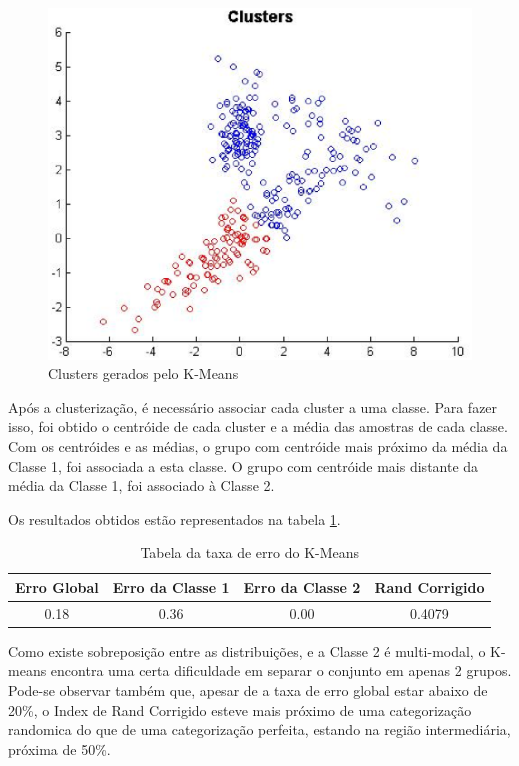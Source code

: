 \begin{figure}[H]
\center
\includegraphics[scale=0.60]{imagens/tecnicas/clusters.eps}
\caption{Clusters gerados pelo K-Means}
\label{fig:clusters}
\end{figure}

Após a clusterização, é necessário associar cada cluster a uma classe. Para fazer isso, foi obtido o centróide de cada cluster e a média das amostras de cada classe. Com os centróides e as médias, o grupo com centróide mais próximo da média da Classe 1, foi associada a esta classe. O grupo com centróide mais distante da média da Classe 1, foi associado à Classe 2.

Os resultados obtidos estão representados na tabela \ref{tab:erro-kmeans}.

\begin{table}[H]
\begin{center}
\begin{tabular}{|c|c|c|c|}
\hline
Erro Global	&	Erro da Classe 1	&	Erro da Classe 2	&	Rand Corrigido	\\
\hline %
	0.18	&		0.36		&		0.00		&	0.4079		\\
\hline
\end{tabular}%
\end{center}   %
\caption{Tabela da taxa de erro do K-Means}
\label{tab:erro-kmeans}
\end{table}

Como existe sobreposição entre as distribuições, e a Classe 2 é multi-modal, o K-means encontra uma certa dificuldade em separar o conjunto em apenas 2 grupos. Pode-se observar também que, apesar de a taxa de erro global estar abaixo de 20\%, o Index de Rand Corrigido esteve mais próximo de uma categorização randomica do que de uma categorização perfeita, estando na região intermediária, próxima de 50\%.

